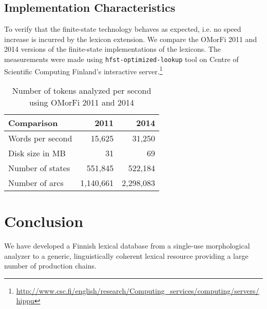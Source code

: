 \documentclass[11pt]{article}
\newif\ifcameraready
\begin{document}
\subsection{Implementation Characteristics}

To verify that the finite-state technology behaves as expected, i.e. no speed
increase is incurred by the lexicon extension.  We compare the OMorFi 2011 and
2014 versions of the finite-state implementations of the lexicons. The
measurements were made using \texttt{hfst-optimized-lookup} tool on Centre of
Scientific Computing Finland's interactive
server.\footnote{\url{http://www.csc.fi/english/research/Computing_services/computing/servers/hippu}}

\begin{table}[h]
    \begin{center}
        \begin{tabular}{|l|rr|}
            \hline
            \bf Comparison       & \bf 2011 & \bf 2014 \\
            \hline
            \sc Words per second           & 15,625           & 31,250\\
            \sc Disk size in MB                 & 31           & 69 \\
            \sc Number of states           & 551,845          & 522,184 \\
            \sc Number of arcs              & 1,140,661           & 2,298,083\\
            \hline
        \end{tabular}
    \end{center}
    \caption{Number of tokens analyzed per second using OMorFi 2011 and 2014}
\end{table}

\section{Conclusion}

We have developed a Finnish lexical database from a single-use morphological
analyzer to a generic, linguistically coherent lexical resource providing a
large number of production chains.

\ifcameraready
\section*{Acknowledgements}

\fi



\end{document}
